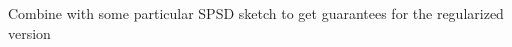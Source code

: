 \documentclass[xcolor={svgnames,pdftex,dvipsnames,table},10pt]{beamer} %
\begin{document}
\begin{frame}
 Combine with some particular SPSD sketch to get guarantees for the
 regularized version
\end{frame}
% 
% 
%  
% 
% 
%  
% 
% 
%  
%  
% 
%  
% 
% 
\end{document}
